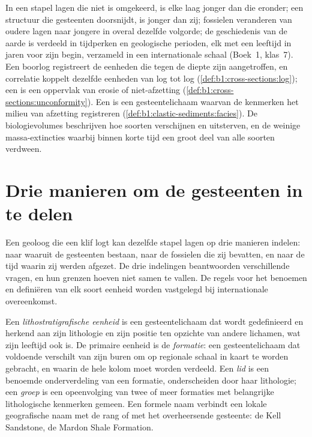 \begin{recall}
In een stapel lagen die niet is omgekeerd, is elke laag jonger dan die eronder; een structuur die gesteenten doorsnijdt, is jonger dan zij; fossielen veranderen van oudere lagen naar jongere in overal dezelfde volgorde; de geschiedenis van de aarde is verdeeld in tijdperken en geologische perioden, elk met een leeftijd in jaren voor zijn begin, verzameld in een internationale schaal (Boek~1, klas~7). Een boorlog registreert de eenheden die tegen de diepte zijn aangetroffen, en correlatie koppelt dezelfde eenheden van log tot log (\cref{def:b1:cross-sections:log}); een  is een oppervlak van erosie of niet-afzetting (\cref{def:b1:cross-sections:unconformity}). Een  is een gesteentelichaam waarvan de kenmerken het milieu van afzetting registreren (\cref{def:b1:clastic-sediments:facies}). De biologievolumes beschrijven hoe soorten verschijnen en uitsterven, en de weinige massa-extincties waarbij binnen korte tijd een groot deel van alle soorten verdween.
\end{recall}

\section{Drie manieren om de gesteenten in te delen}\label{sec:b1:stratigraphic-scale:three}

Een geoloog die een klif logt kan dezelfde stapel lagen op drie manieren indelen: naar waaruit de gesteenten bestaan, naar de fossielen die zij bevatten, en naar de tijd waarin zij werden afgezet. De drie indelingen beantwoorden verschillende vragen, en hun grenzen hoeven niet samen te vallen. De regels voor het benoemen en definiëren van elk soort eenheid worden vastgelegd bij internationale overeenkomst.

\begin{definition}\label{def:b1:stratigraphic-scale:lithostratigraphy}
Een \emph{lithostratigrafische eenheid} is een gesteentelichaam dat wordt gedefinieerd en herkend aan zijn lithologie en zijn positie ten opzichte van andere lichamen, wat zijn leeftijd ook is. De primaire eenheid is de \emph{formatie}: een gesteentelichaam dat voldoende verschilt van zijn buren om op regionale schaal in kaart te worden gebracht, en waarin de hele kolom moet worden verdeeld. Een \emph{lid} is een benoemde onderverdeling van een formatie, onderscheiden door haar lithologie; een \emph{groep} is een opeenvolging van twee of meer formaties met belangrijke lithologische kenmerken gemeen. Een formele naam verbindt een lokale geografische naam met de rang of met het overheersende gesteente: de Kell Sandstone, de Mardon Shale Formation.
\end{definition}

